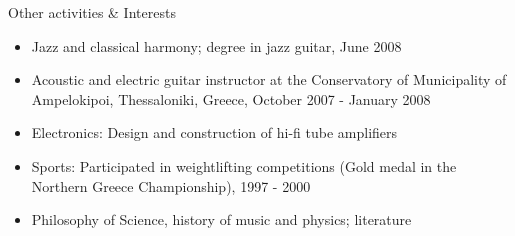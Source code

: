 \documentclass[10pt]{article} %
\newenvironment{outerlist}[1][\enskip\textbullet]%
        {\begin{itemize}[#1]}{\end{itemize}%
         \vspace{-.6\baselineskip}}
\begin{document}
\begin{section}{Other activities \& Interests}
\begin{outerlist}

\item \vskip -7mm 
Jazz and classical harmony; degree in jazz guitar, June 2008
\item Acoustic and electric guitar instructor at the Conservatory 
of Municipality of Ampelokipoi, Thessaloniki, Greece, October 2007 - January 2008
\item Electronics: Design and construction of hi-fi tube amplifiers
\item Sports: Participated in weightlifting competitions (Gold medal in the 
Northern Greece Championship), 1997 - 2000
\item Philosophy of Science, history of music and physics; literature
\end{outerlist}

\end{section}

\clearpage

\end{document}
